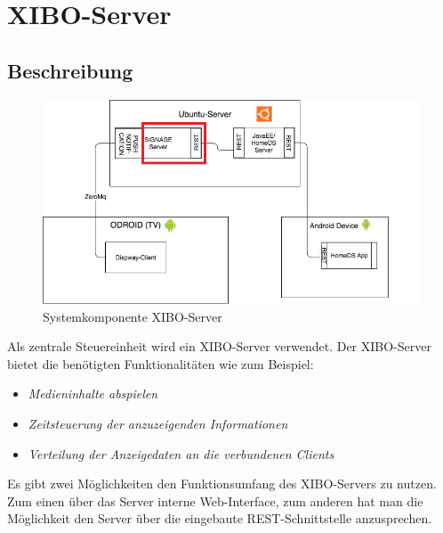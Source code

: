 \chapter{XIBO-Server}
\section{Beschreibung}
\begin{figure}[H]
\centering
\includegraphics[width=1.0\textwidth]{images/03_XIBO-Server/03_SystemArch}
\caption{Systemkomponente XIBO-Server}
\label{fig:mediaNav}
\end{figure}

Als zentrale Steuereinheit wird ein XIBO-Server verwendet. Der XIBO-Server bietet die benötigten Funktionalitäten wie zum Beispiel:
\begin{itemize}
	\item {\em Medieninhalte abspielen} 
	\item {\em Zeitsteuerung der anzuzeigenden Informationen}  
	\item {\em Verteilung der Anzeigedaten an die verbundenen Clients} 
\end{itemize}
Es gibt zwei Möglichkeiten den Funktionsumfang des XIBO-Servers zu nutzen. Zum einen über das Server interne Web-Interface, zum anderen hat man die  Möglichkeit den Server über die eingebaute REST-Schnittstelle anzusprechen.
\cite{xibo-server}
